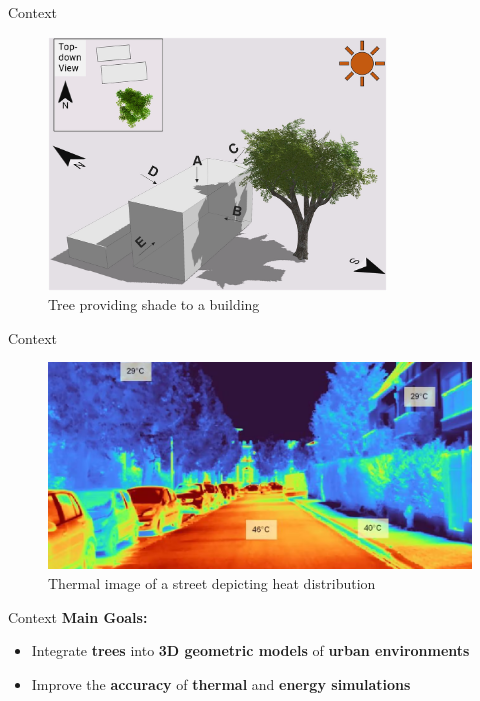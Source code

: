 \documentclass[12pt]{beamer}
\begin{document}
\begin{frame}{Context}
  \begin{figure}
      \centering
      \includegraphics[width=0.8\textwidth]{images/TreeShade.png}
      \caption{Tree providing shade to a building\cite{img:TreeShade}}
  \end{figure}
\end{frame}

\begin{frame}{Context}
  \begin{figure}
      \centering
      \includegraphics[width=\textwidth]{images/heat_street.png}
      \caption{Thermal image of a street depicting heat distribution\cite{img:street_thermography}}
  \end{figure}
\end{frame}

\begin{frame}{Context}
  \Large 
  \textbf{Main Goals:}
  \begin{itemize}
    \item Integrate \textbf{trees} into \textbf{3D geometric models} of \textbf{urban environments}
    \item Improve the \textbf{accuracy} of \textbf{thermal} and \textbf{energy simulations}
  \end{itemize}
\end{frame}
\end{document}
